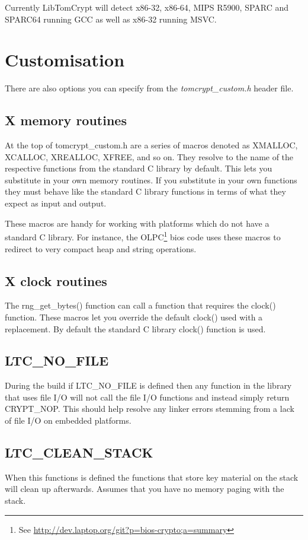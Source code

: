 \documentclass[synpaper]{book}
\newcommand{\mysection}[1]    %
	{                   %
	\section{#1}
   \markboth{\textsf{www.libtom.net}}{\thesection ~ {#1}}
	}
\begin{document}
Currently LibTomCrypt will detect x86-32, x86-64, MIPS R5900, SPARC and SPARC64 running GCC as well as x86-32 running MSVC.

\mysection{Customisation}
There are also options you can specify from the \textit{tomcrypt\_custom.h} header file.

\subsection{X memory routines}
At the top of tomcrypt\_custom.h are a series of macros denoted as XMALLOC, XCALLOC, XREALLOC, XFREE, and so on.  They resolve to
the name of the respective functions from the standard C library by default.  This lets you substitute in your own memory routines.
If you substitute in your own functions they must behave like the standard C library functions in terms of what they expect as input and
output.

These macros are handy for working with platforms which do not have a standard C library.
For instance, the OLPC\footnote{See \url{http://dev.laptop.org/git?p=bios-crypto;a=summary}}
bios code uses these macros to redirect to very compact heap and string operations.

\subsection{X clock routines}
The rng\_get\_bytes() function can call a function that requires the clock() function.  These macros let you override
the default clock() used with a replacement.  By default the standard C library clock() function is used.

\subsection{LTC\_NO\_FILE}
During the build if LTC\_NO\_FILE is defined then any function in the library that uses file I/O will not call the file I/O
functions and instead simply return CRYPT\_NOP.  This should help resolve any linker errors stemming from a lack of
file I/O on embedded platforms.

\subsection{LTC\_CLEAN\_STACK}
When this functions is defined the functions that store key material on the stack will clean up afterwards.
Assumes that you have no memory paging with the stack.
\end{document}
